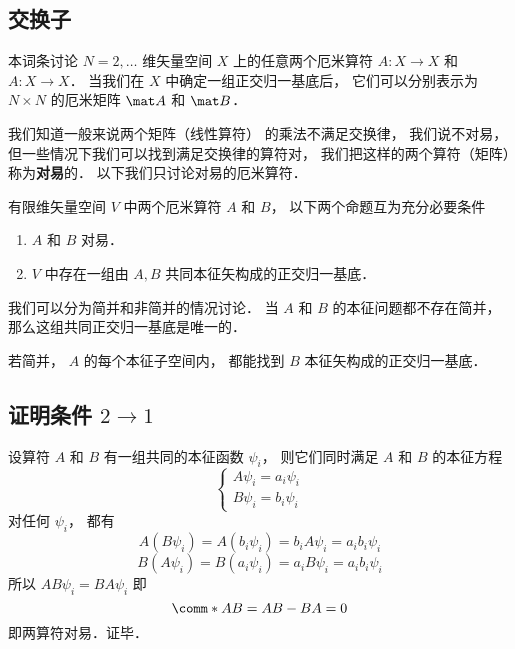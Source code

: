 


\subsection{交换子}
本词条讨论 $N = 2, \dots$ 维矢量空间 $X$ 上的任意两个厄米算符 $A: X \to X$ 和 $A: X \to X$． 当我们在 $X$ 中确定一组正交归一基底后， 它们可以分别表示为 $N \times N$ 的厄米矩阵 $\mat A$ 和 $\mat B$．

我们知道一般来说两个矩阵（线性算符）%
的乘法不满足交换律， 我们说不对易， 但一些情况下我们可以找到满足交换律的算符对， 我们把这样的两个算符（矩阵）称为\textbf{对易}的． 以下我们只讨论对易的厄米算符．

\begin{theorem}{}
有限维矢量空间 $V$ 中两个厄米算符 $A$ 和 $B$， 以下两个命题互为充分必要条件
\begin{enumerate}
\item $A$ 和 $B$ 对易．
\item $V$ 中存在一组由 $A, B$ 共同本征矢构成的正交归一基底．
\end{enumerate}
\end{theorem}

我们可以分为简并和非简并的情况讨论． 当 $A$ 和 $B$ 的本征问题都不存在简并， 那么这组共同正交归一基底是唯一的．

若简并， $A$ 的每个本征子空间内， 都能找到 $B$ 本征矢构成的正交归一基底．

\subsection{证明条件 $2 \to 1$}
设算符 $A$ 和 $B$ 有一组共同的本征函数 $\psi_i$，  则它们同时满足 $A$ 和 $B$ 的本征方程
\begin{equation}
\begin{cases}
A \psi_i = a_i \psi_i\\
B \psi_i = b_i \psi_i
\end{cases}
\end{equation}
对任何 $\psi_i$，  都有
\begin{equation}
A (B \psi_i) = A (b_i \psi_i) = b_iA \psi_i = a_i b_i \psi_i
\end{equation}
\begin{equation}
B (A \psi_i) = B (a_i \psi_i) = a_i B \psi_i = a_i b_i \psi_i
\end{equation}
所以 $AB \psi_i = BA \psi_i$ 即
\begin{equation}
\comm*{A}{B} = AB - BA = 0
\end{equation}
即两算符对易．证毕．

